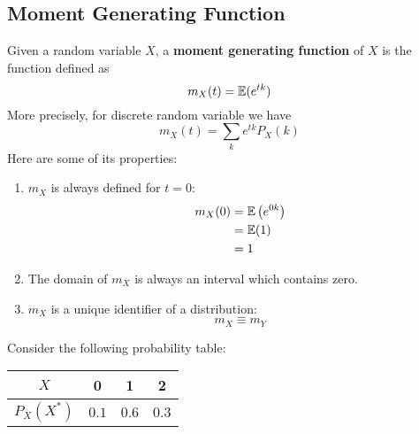 \documentclass{article}
\begin{document}
\subsection{Moment Generating Function}
	\begin{defn}
		Given a random variable $X$, a \textbf{moment generating function} of $X$ is the function defined as
		$$ m_X (t) = \mathbb{E} (e^{tk})$$
		More precisely, for  discrete random variable we have
		$$ m_X (t) = \sum_{k} e^{tk} P_X (k)$$
		Here are some of its properties:
		\begin{enumerate}
			\item $m_X$ is always defined for $t=0$:
			\begin{align*}
					m_X(0) &= \mathbb{E} \left( e^{0k} \right) \\
					&= \mathbb{E} (1) \\
					&= 1
			\end{align*}
			\item The domain of $m_X$ is always an interval which contains zero.
			\item $m_X$ is a unique identifier of a distribution:
			$$ m_X \equiv m_Y$$
		\end{enumerate}
	\end{defn}
	\begin{exmp}
		Consider the following probability table:
		\begin{table}[h]
			\begin{tabular}{c|c|c|c}
				$X$ & 0     & 1    & 2 \\ \hline
				$P_X(X^*)$ & $0.1$ & $0.6$ &$0.3$
			\end{tabular}
		\end{table}
	\end{exmp}
\end{document}
